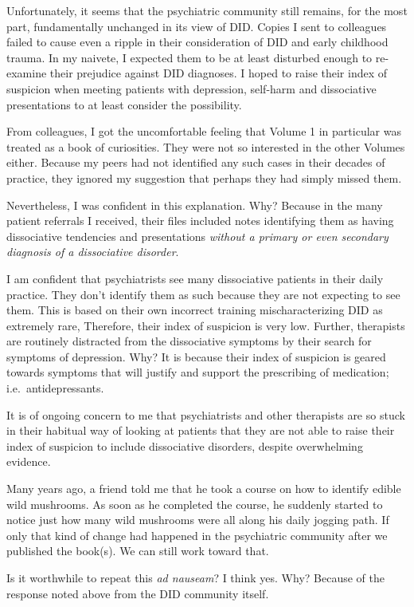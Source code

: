 \documentclass[]{book}
\begin{document}
Unfortunately, it seems that the psychiatric community still remains, for the most part, fundamentally unchanged in its view of DID. Copies I sent to colleagues failed to cause even a ripple in their consideration of DID and early childhood trauma. In my naivete, I expected them to be at least disturbed enough to re-examine their prejudice against DID diagnoses. I hoped to raise their index of suspicion when meeting patients with depression, self-harm and dissociative presentations to at least consider the possibility.

From colleagues, I got the uncomfortable feeling that Volume 1 in particular was treated as a book of curiosities. They were not so interested in the other Volumes either. Because my peers had not identified any such cases in their decades of practice, they ignored my suggestion that perhaps they had simply missed them.

Nevertheless, I was confident in this explanation. Why? Because in the many patient referrals I received, their files included notes identifying them as having dissociative tendencies and presentations \emph{without a primary or even secondary diagnosis of a dissociative disorder}.

I am confident that psychiatrists see many dissociative patients in their daily practice. They don't identify them as such because they are not expecting to see them. This is based on their own incorrect training mischaracterizing DID as extremely rare, Therefore, their index of suspicion is very low. Further, therapists are routinely distracted from the dissociative symptoms by their search for symptoms of depression. Why? It is because their index of suspicion is geared towards symptoms that will justify and support the prescribing of medication; i.e.~antidepressants.

It is of ongoing concern to me that psychiatrists and other therapists are so stuck in their habitual way of looking at patients that they are not able to raise their index of suspicion to include dissociative disorders, despite overwhelming evidence.

Many years ago, a friend told me that he took a course on how to identify edible wild mushrooms. As soon as he completed the course, he suddenly started to notice just how many wild mushrooms were all along his daily jogging path. If only that kind of change had happened in the psychiatric community after we published the book(s). We can still work toward that.

Is it worthwhile to repeat this \emph{ad nauseam}? I think yes. Why? Because of the response noted above from the DID community itself.
\end{document}
